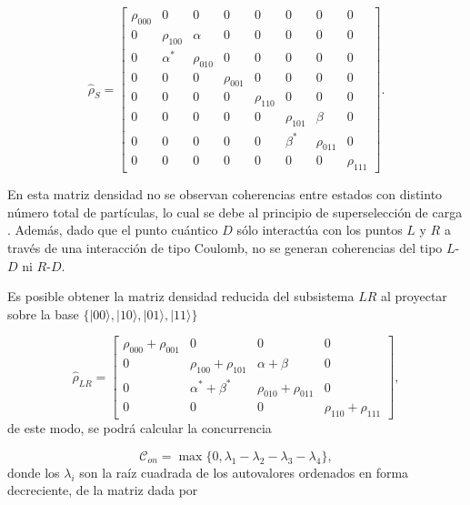 \begin{appendixs}
\begin{equation}
    \hat{\rho}_{S} = 
    \begin{bmatrix}
        \rho_{000} & 0 & 0 & 0 & 0 & 0 & 0 & 0 \\
        0 & \rho_{100} & \alpha & 0 & 0 & 0 & 0 & 0 \\
        0 & \alpha^{*} & \rho_{010} & 0 & 0 & 0 & 0 & 0 \\
        0 & 0 & 0 & \rho_{001} & 0 & 0 & 0 & 0 \\
        0 & 0 & 0 & 0 & \rho_{110} & 0 & 0 & 0 \\
        0 & 0 & 0 & 0 & 0 & \rho_{101} & \beta & 0 \\
        0 & 0 & 0 & 0 & 0 & \beta^{*} & \rho_{011} & 0 \\
        0 & 0 & 0 & 0 & 0 & 0 & 0 & \rho_{111} 
        \end{bmatrix}.
        \label{appendix5rhoconcu}
\end{equation}

En esta matriz densidad no se observan coherencias entre estados con distinto número total de partículas, lo cual se debe al principio de superselección de carga \cite{bartlett2007reference,wick1997intrinsic}. Además, dado que el punto cuántico $D$ sólo interactúa con los puntos $L$ y $R$ a través de una interacción de tipo Coulomb, no se generan coherencias del tipo $L$-$D$ ni $R$-$D$. 

Es posible obtener la matriz densidad reducida del subsistema $LR$ al proyectar sobre la base  $\{|00\rangle, |10\rangle, |01\rangle, |11\rangle\}$

\begin{equation*}
    \hat{\rho}_{LR} = 
    \begin{bmatrix}
        \rho_{000}+\rho_{001} & 0 & 0 & 0  \\
        0 & \rho_{100} + \rho_{101} & \alpha + \beta & 0  \\
        0 & \alpha^{*} +\beta^{*} & \rho_{010} + \rho_{011} & 0  \\
        0 & 0 & 0 & \rho_{110} + \rho_{111} 
        \end{bmatrix},
\end{equation*}
de este modo, se podrá calcular la concurrencia 

\begin{equation*}
    \mathcal{C}_{on} = \max \{ 0,\lambda_{1} - \lambda_{2} - \lambda_{3} - \lambda_{4} \},
\end{equation*}
donde los $\lambda_{i}$ son la raíz cuadrada de los autovalores ordenados en forma decreciente, de la matriz dada por 


\end{appendixs}
